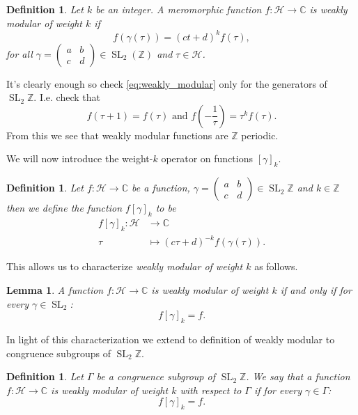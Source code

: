 \documentclass[a4paper]{article}
\theoremstyle{theoremdd}
\newtheorem{lemma}[theorem]{Lemma}
\theoremstyle{definitiondd}
\newtheorem{definition}[theorem]{Definition}
\theoremstyle{remarkdd}
\newcommand{\Z}{\mathbb{Z}}
\newcommand{\C}{\mathbb{C}}
\DeclareMathOperator{\SL}{SL}
\begin{document}
\begin{definition}
	Let $k$ be an integer. 
	A meromorphic function $f: \mathcal{H}  \to \C$ is \emph{weakly modular of weight $k$ } if \begin{equation} \label{eq:weakly_modular}
		f(\gamma(\tau)) = (ct + d)^{k}f(\tau)
	,\end{equation}
	for all $\gamma = \begin{pmatrix} a & b \\ c & d \end{pmatrix}  \in \SL_2(\Z)$ and $\tau \in \mathcal{H} $. 
\end{definition}

It's clearly enough so check \eqref{eq:weakly_modular} only for the generators of $\SL_2\Z$. I.e. check that
\begin{equation}\label{eq:sufficient_weakly_modular}
	f(\tau + 1) = f(\tau) \text{ and } f\left(-\frac{1}{\tau}\right)  = \tau^{k}f(\tau)
.\end{equation} 
From this we see that weakly modular functions are $\Z$ periodic. 

We will now introduce the weight-$k$ operator on functions $[\gamma]_k$.
 \begin{definition}
	 Let $f: \mathcal{H}  \to \C$ be a function,  $\gamma = \begin{pmatrix} a & b \\ c & d \end{pmatrix} \in \SL_2\Z$ and $k \in \Z$ then we define the function $f[\gamma]_k$ to be 
	  \begin{align*}
		  f[\gamma]_k: \mathcal{H}  &\longrightarrow \C \\
		  \tau &\longmapsto (c\tau + d)^{-k}f(\gamma(\tau))
	 .\end{align*}
\end{definition}
This allows us to characterize  \emph{weakly modular of weight  $k$} as follows.
 \begin{lemma}
	 A function $f: \mathcal{H}  \to \C$ is weakly modular of weight $k$ if and only if for every $\gamma \in \SL_2$: \[
		 f[\gamma]_k = f
	 .\] 
\end{lemma}
In light of this characterization we extend to definition of weakly modular to congruence subgroups of $\SL_2\Z$. 

\begin{definition}
	Let $\Gamma$ be a congruence subgroup of $\SL_2\Z$. We say that a function $f: \mathcal{H}  \to \C$ is \emph{weakly modular of weight $k$ with respect to $\Gamma$} if for every  $ \gamma \in \Gamma$:
	 \[
		 f[\gamma]_k = f 
	.\] 
\end{definition}
\end{document}
